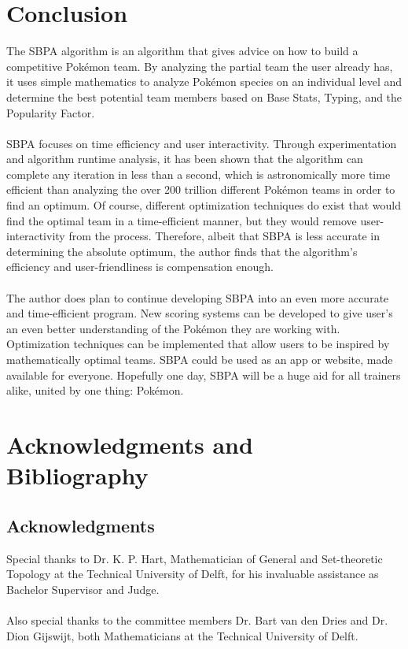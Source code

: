 \documentclass{article}
\begin{document}
\section{Conclusion}
The SBPA algorithm is an algorithm that gives advice on how to build a competitive Pok\'emon team. By analyzing the partial team the user already has, it uses simple mathematics to analyze Pok\'emon species on an individual level and determine the best potential team members based on Base Stats, Typing, and the Popularity Factor.\\\\
SBPA focuses on time efficiency and user interactivity. Through experimentation and algorithm runtime analysis, it has been shown that the algorithm can complete any iteration in less than a second, which is astronomically more time efficient than analyzing the over 200 trillion different Pok\'emon teams in order to find an optimum. Of course, different optimization techniques do exist that would find the optimal team in a time-efficient manner, but they would remove user-interactivity from the process. Therefore, albeit that SBPA is less accurate in determining the absolute optimum, the author finds that the algorithm's efficiency and user-friendliness is compensation enough.\\\\
The author does plan to continue developing SBPA into an even more accurate and time-efficient program. New scoring systems can be developed to give user's an even better understanding of the Pok\'emon they are working with. Optimization techniques can be implemented that allow users to be inspired by mathematically optimal teams. SBPA could be used as an app or website, made available for everyone. Hopefully one day, SBPA will be a huge aid for all trainers alike, united by one thing: Pok\'emon.

\newpage
\section{Acknowledgments and Bibliography}
\subsection{Acknowledgments}
Special thanks to Dr. K. P. Hart, Mathematician of General and Set-theoretic Topology at the Technical University of Delft, for his invaluable assistance as Bachelor Supervisor and Judge.\\\\
Also special thanks to the committee members Dr. Bart van den Dries and Dr. Dion Gijswijt, both Mathematicians at the Technical University of Delft.
\end{document}
